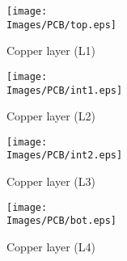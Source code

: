 \begin{figure}
\begin{minipage}[b]{0.24\textwidth}
  \texttt{[image: \\Images/PCB/top.eps]}
  \caption*{Copper layer (L1)}
\end{minipage}%
\hfill%
\begin{minipage}[b]{0.24\textwidth}
  \texttt{[image: \\Images/PCB/int1.eps]}
  \caption*{Copper layer (L2)}
\end{minipage}%
\hfill%
\begin{minipage}[b]{0.24\textwidth}
  \texttt{[image: \\Images/PCB/int2.eps]}
  \caption*{Copper layer (L3)}
\end{minipage}%
\hfill%
\begin{minipage}[b]{0.24\textwidth}
  \texttt{[image: \\Images/PCB/bot.eps]}
  \caption*{Copper layer (L4)}
\end{minipage}
\end{figure}